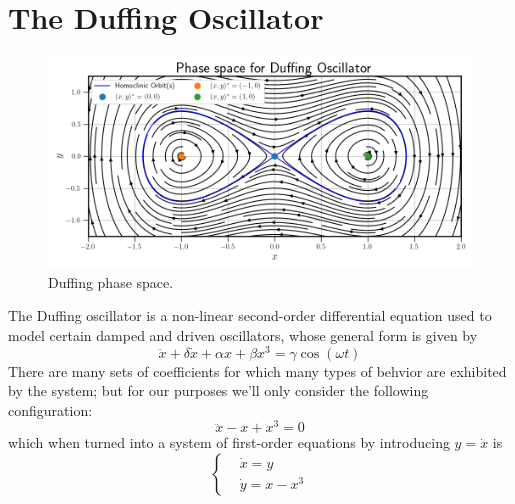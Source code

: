 \section{The Duffing Oscillator}
\label{section:duffing results}

\begin{figure}[!ht]
    \centering
    \begin{minipage}{\textwidth}
        \includegraphics[width=\textwidth]{"Figures/duffing_phase_space.png"}
    \end{minipage}
    \caption{Duffing phase space.}
    \label{fig:duffing phase space}
\end{figure}

The Duffing oscillator is a non-linear second-order differential equation used to model 
certain damped and driven oscillators, whose general form is given by
\begin{equation}
    \ddot{x} + \delta\dot{x} + \alpha x + \beta x^3 = \gamma\cos(\omega t)
\end{equation}
There are many sets of coefficients for which many types of behvior are exhibited by the
system; but for our purposes we'll only consider the following configuration:
\begin{equation}
    \ddot{x} - x + x^3 = 0
\end{equation}
which when turned into a system of first-order equations by introducing $y = \dot{x}$ is
\begin{equation}
    \begin{cases}
        & \dot{x} = y \\
        & \dot{y} = x - x^3  
    \end{cases}
\end{equation}

